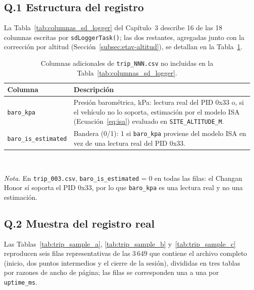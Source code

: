 \subsection*{Q.1 Estructura del registro}

La Tabla~\ref{tab:columnas_sd_logger} del Capítulo~3 describe 16 de las 18
columnas escritas por \texttt{sdLoggerTask()}; las dos restantes, agregadas
junto con la corrección por altitud (Sección~\ref{subsec:etav-altitud}), se
detallan en la Tabla~\ref{tab:trip_cols_extra}.

\begin{table}[H]
	\centering
	\captionsetup{labelformat=simple, labelsep=newline, textfont=it, labelfont=bf, justification=raggedright, singlelinecheck=false}
	\caption{Columnas adicionales de \texttt{trip\_NNN.csv} no incluidas en la Tabla~\ref{tab:columnas_sd_logger}.}
	\label{tab:trip_cols_extra}
	\begin{tabularx}{\textwidth}{l X}
		\toprule
		\rowcolor[rgb]{0.851, 0.851, 0.851}
		Columna & Descripción \\
		\midrule
		\texttt{baro\_kpa}          & Presión barométrica, kPa: lectura real del PID 0x33 o, si el vehículo no lo soporta, estimación por el modelo ISA (Ecuación~\ref{eq:isa}) evaluado en \texttt{SITE\_ALTITUDE\_M}. \\
		\texttt{baro\_is\_estimated} & Bandera (0/1): 1 si \texttt{baro\_kpa} proviene del modelo ISA en vez de una lectura real del PID 0x33. \\
		\bottomrule
	\end{tabularx}
	\\
	\vspace{2mm}
	\begin{minipage}{\linewidth}
		\small
		\textit{Nota.} En \texttt{trip\_003.csv}, \texttt{baro\_is\_estimated} = 0 en todas las filas: el Changan Honor sí soporta el PID 0x33, por lo que \texttt{baro\_kpa} es una lectura real y no una estimación.
	\end{minipage}
\end{table}

\subsection*{Q.2 Muestra del registro real}

Las Tablas~\ref{tab:trip_sample_a}, \ref{tab:trip_sample_b} y~\ref{tab:trip_sample_c}
reproducen seis filas representativas de las 3\,649 que contiene el archivo
completo (inicio, dos puntos intermedios y el cierre de la sesión), divididas
en tres tablas por razones de ancho de página; las filas se corresponden una
a una por \texttt{uptime\_ms}.

